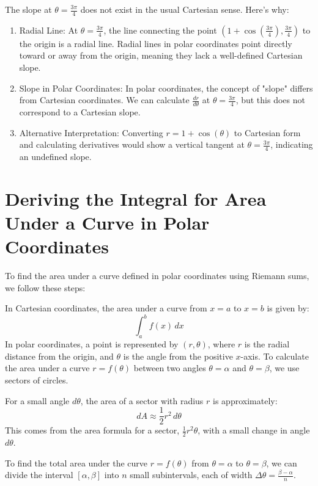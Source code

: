 \documentclass{report}
\begin{document}
{	The slope at \( \theta = \frac{3\pi}{4} \) does not exist in the usual Cartesian sense. Here’s why:

	\begin{enumerate}
		\item Radial Line: At \( \theta = \frac{3\pi}{4} \), the line connecting the point \( \left(1 + \cos\left(\frac{3\pi}{4}\right), \frac{3\pi}{4}\right) \) to the origin is a radial line. Radial lines in polar coordinates point directly toward or away from the origin, meaning they lack a well-defined Cartesian slope.

		\item Slope in Polar Coordinates: In polar coordinates, the concept of "slope" differs from Cartesian coordinates. We can calculate \( \frac{dr}{d\theta} \) at \( \theta = \frac{3\pi}{4} \), but this does not correspond to a Cartesian slope.

		\item Alternative Interpretation: Converting \( r = 1 + \cos(\theta) \) to Cartesian form and calculating derivatives would show a vertical tangent at \( \theta = \frac{3\pi}{4} \), indicating an undefined slope.
	\end{enumerate}

}

\section{Deriving the Integral for Area Under a Curve in Polar Coordinates}

To find the area under a curve defined in polar coordinates using Riemann sums, we follow these steps:

In Cartesian coordinates, the area under a curve from \( x = a \) to \( x = b \) is given by:
\[
	\int_a^b f(x) \, dx
\]
In polar coordinates, a point is represented by \( (r, \theta) \), where \( r \) is the radial distance from the origin, and \( \theta \) is the angle from the positive \( x \)-axis. To calculate the area under a curve \( r = f(\theta) \) between two angles \( \theta = \alpha \) and \( \theta = \beta \), we use sectors of circles.

For a small angle \( d\theta \), the area of a sector with radius \( r \) is approximately:
\[
	dA \approx \frac{1}{2} r^2 \, d\theta
\]
This comes from the area formula for a sector, \( \frac{1}{2} r^2 \theta \), with a small change in angle \( d\theta \).

To find the total area under the curve \( r = f(\theta) \) from \( \theta = \alpha \) to \( \theta = \beta \), we can divide the interval \( [\alpha, \beta] \) into \( n \) small subintervals, each of width \( \Delta \theta = \frac{\beta - \alpha}{n} \).
\end{document}
